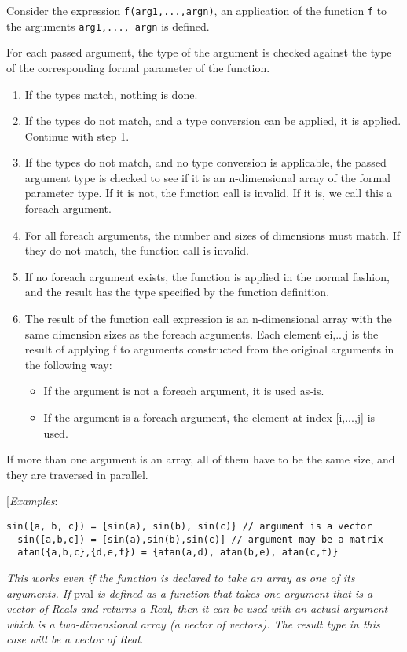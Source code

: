 Consider the expression \lstinline!f(arg1,...,argn)!, an application of the function
\lstinline!f! to the arguments \lstinline!arg1,..., argn! is defined.

For each passed argument, the type of the argument is checked against
the type of the corresponding formal parameter of the function.

\begin{enumerate}
\item
  If the types match, nothing is done.
\item
  If the types do not match, and a type conversion can be applied, it is
  applied. Continue with step 1.
\item
  If the types do not match, and no type conversion is applicable, the
  passed argument type is checked to see if it is an n-dimensional array
  of the formal parameter type. If it is not, the function call is
  invalid. If it is, we call this a foreach argument.
\item
  For all foreach arguments, the number and sizes of dimensions must
  match. If they do not match, the function call is invalid.
\item
  If no foreach argument exists, the function is applied in the normal
  fashion, and the result has the type specified by the function
  definition.
\item
  The result of the function call expression is an n-dimensional array
  with the same dimension sizes as the foreach arguments. Each element
  ei,..,j is the result of applying f to arguments constructed from the
  original arguments in the following way:
\begin{itemize}
\item
  If the argument is not a foreach argument, it is used as-is.
\item
  If the argument is a foreach argument, the element at index
  {[}i,...,j{]} is used.
\end{itemize}
\end{enumerate}

If more than one argument is an array, all of them have to be the same
size, and they are traversed in parallel.

{[}\emph{Examples}:

\begin{lstlisting}[language=modelica]
  sin({a, b, c}) = {sin(a), sin(b), sin(c)} // argument is a vector
  sin([a,b,c]) = [sin(a),sin(b),sin(c)] // argument may be a matrix
  atan({a,b,c},{d,e,f}) = {atan(a,d), atan(b,e), atan(c,f)}
\end{lstlisting}
\emph{This works even if the function is declared to take an array as
one of its arguments. If} pval \emph{is defined as a function that takes
one argument that is a vector of Reals and returns a Real, then it can
be used with an actual argument which is a two-dimensional array (a
vector of vectors). The result type in this case will be a vector of
Real. }


